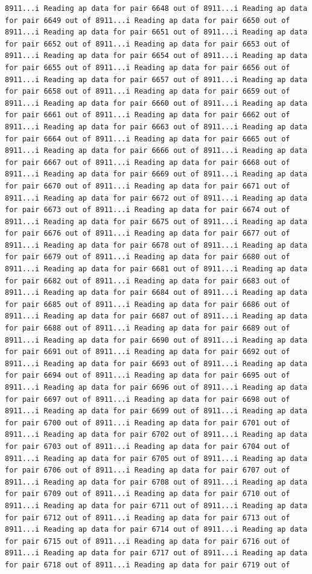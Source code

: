 \documentclass[
]{article}
\begin{document}
\begin{verbatim}
8911...i Reading ap data for pair 6648 out of 8911...i Reading ap data for pair 6649 out of 8911...i Reading ap data for pair 6650 out of 8911...i Reading ap data for pair 6651 out of 8911...i Reading ap data for pair 6652 out of 8911...i Reading ap data for pair 6653 out of 8911...i Reading ap data for pair 6654 out of 8911...i Reading ap data for pair 6655 out of 8911...i Reading ap data for pair 6656 out of 8911...i Reading ap data for pair 6657 out of 8911...i Reading ap data for pair 6658 out of 8911...i Reading ap data for pair 6659 out of 8911...i Reading ap data for pair 6660 out of 8911...i Reading ap data for pair 6661 out of 8911...i Reading ap data for pair 6662 out of 8911...i Reading ap data for pair 6663 out of 8911...i Reading ap data for pair 6664 out of 8911...i Reading ap data for pair 6665 out of 8911...i Reading ap data for pair 6666 out of 8911...i Reading ap data for pair 6667 out of 8911...i Reading ap data for pair 6668 out of 8911...i Reading ap data for pair 6669 out of 8911...i Reading ap data for pair 6670 out of 8911...i Reading ap data for pair 6671 out of 8911...i Reading ap data for pair 6672 out of 8911...i Reading ap data for pair 6673 out of 8911...i Reading ap data for pair 6674 out of 8911...i Reading ap data for pair 6675 out of 8911...i Reading ap data for pair 6676 out of 8911...i Reading ap data for pair 6677 out of 8911...i Reading ap data for pair 6678 out of 8911...i Reading ap data for pair 6679 out of 8911...i Reading ap data for pair 6680 out of 8911...i Reading ap data for pair 6681 out of 8911...i Reading ap data for pair 6682 out of 8911...i Reading ap data for pair 6683 out of 8911...i Reading ap data for pair 6684 out of 8911...i Reading ap data for pair 6685 out of 8911...i Reading ap data for pair 6686 out of 8911...i Reading ap data for pair 6687 out of 8911...i Reading ap data for pair 6688 out of 8911...i Reading ap data for pair 6689 out of 8911...i Reading ap data for pair 6690 out of 8911...i Reading ap data for pair 6691 out of 8911...i Reading ap data for pair 6692 out of 8911...i Reading ap data for pair 6693 out of 8911...i Reading ap data for pair 6694 out of 8911...i Reading ap data for pair 6695 out of 8911...i Reading ap data for pair 6696 out of 8911...i Reading ap data for pair 6697 out of 8911...i Reading ap data for pair 6698 out of 8911...i Reading ap data for pair 6699 out of 8911...i Reading ap data for pair 6700 out of 8911...i Reading ap data for pair 6701 out of 8911...i Reading ap data for pair 6702 out of 8911...i Reading ap data for pair 6703 out of 8911...i Reading ap data for pair 6704 out of 8911...i Reading ap data for pair 6705 out of 8911...i Reading ap data for pair 6706 out of 8911...i Reading ap data for pair 6707 out of 8911...i Reading ap data for pair 6708 out of 8911...i Reading ap data for pair 6709 out of 8911...i Reading ap data for pair 6710 out of 8911...i Reading ap data for pair 6711 out of 8911...i Reading ap data for pair 6712 out of 8911...i Reading ap data for pair 6713 out of 8911...i Reading ap data for pair 6714 out of 8911...i Reading ap data for pair 6715 out of 8911...i Reading ap data for pair 6716 out of 8911...i Reading ap data for pair 6717 out of 8911...i Reading ap data for pair 6718 out of 8911...i Reading ap data for pair 6719 out of 
\end{verbatim}
\end{document}
